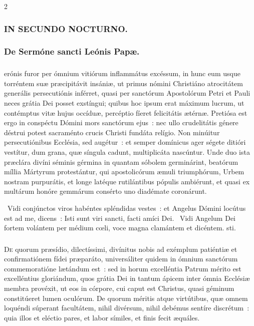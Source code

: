 \documentclass[9pt,twoside]{extarticle}
\begin{document}
\begin{multicols}{2}
{\subsubsection*{\center \textsc{IN SECUNDO NOCTURNO.}}
\subsubsection*{\center De Sermóne sancti Leónis Papæ.}
\subsubsection*{\center {}}
erónis furor per ómnium vitiórum inflammátus excéssum, in hunc eum usque torréntem suæ præcipitávit insániæ, ut primus nómini Christiáno atrocitátem generális persecutiónis inférret, quasi per sanctórum Apostolórum Petri et Pauli neces grátia Dei posset exstíngui; quibus hoc ipsum erat máximum lucrum, ut contémptus vitæ hujus occíduæ, percéptio fíeret felicitátis ætérnæ. Pretiósa est ergo in conspéctu Dómini mors sanctórum ejus~: nec ullo crudelitátis génere déstrui potest sacraménto crucis Christi fundáta relígio. Non minúitur persecutiónibus Ecclésia, sed augétur~: et semper domínicus ager ségete ditióri vestítur, dum grana, quæ síngula cadunt, multiplicáta nascúntur. Unde duo ista præclára divíni séminis gérmina in quantam sóbolem germinárint, beatórum míllia Mártyrum protestántur, qui apostolicórum æmuli triumphórum, Urbem nostram purpurátis, et longe latéque rutilántibus pópulis ambiérunt, et quasi ex multárum honóre gemmárum consérto uno diadémate coronárunt.

\begin{tightlist}{}
\item {}~Vidi conjúnctos viros habéntes spléndidas vestes~: et Angelus Dómini locútus est ad me, dicens~: \textred{*} Isti sunt viri sancti, facti amíci Dei. ~Vidi Angelum Dei fortem volántem per médium cœli, voce magna clamántem et dicéntem. sti.
\end{tightlist}

\subsubsection*{\center {}}
\lettrine{D}e quorum præsídio, dilectíssimi, divínitus nobis ad exémplum patiéntiæ et confirmatiónem fídei præparáto, universáliter quidem in ómnium sanctórum commemoratióne lætándum est~: sed in horum excelléntia Patrum mérito est excelléntius gloriándum, quos grátia Dei in tantum ápicem inter ómnia Ecclésiæ membra provéxit, ut eos in córpore, cui caput est Christus, quasi géminum constitúeret lumen oculórum. De quorum méritis atque virtútibus, quæ omnem loquéndi súperant facultátem, nihil divérsum, nihil debémus sentíre discrétum~: quia illos et eléctio pares, et labor símiles, et finis fecit æquáles.

}
\end{multicols}
\end{document}
